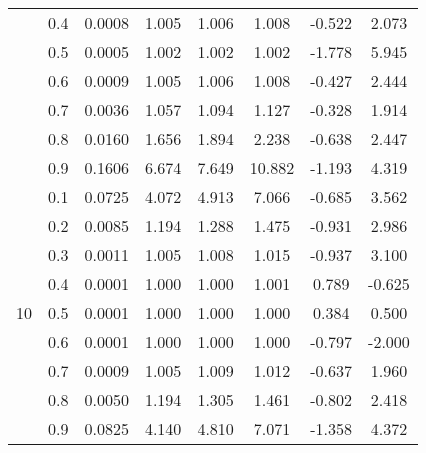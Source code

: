 \documentclass[11pt,a4paper]{report}
\begin{document}
\begin{longtable}{ | c | c || c | c | c | c | c | c | }
 & 0.4 & 0.0008 & 1.005 & 1.006 & 1.008 & -0.522 & 2.073 \\
 & 0.5 & 0.0005 & 1.002 & 1.002 & 1.002 & -1.778 & 5.945 \\
 & 0.6 & 0.0009 & 1.005 & 1.006 & 1.008 & -0.427 & 2.444 \\
 & 0.7 & 0.0036 & 1.057 & 1.094 & 1.127 & -0.328 & 1.914 \\
 & 0.8 & 0.0160 & 1.656 & 1.894 & 2.238 & -0.638 & 2.447 \\
 & 0.9 & 0.1606 & 6.674 & 7.649 & 10.882 & -1.193 & 4.319 \\
 \hline
\multirow{9}{*}{10} & 0.1 & 0.0725 & 4.072 & 4.913 & 7.066 & -0.685 & 3.562 \\
 & 0.2 & 0.0085 & 1.194 & 1.288 & 1.475 & -0.931 & 2.986 \\
 & 0.3 & 0.0011 & 1.005 & 1.008 & 1.015 & -0.937 & 3.100 \\
 & 0.4 & 0.0001 & 1.000 & 1.000 & 1.001 & 0.789 & -0.625 \\
 & 0.5 & 0.0001 & 1.000 & 1.000 & 1.000 & 0.384 & 0.500 \\
 & 0.6 & 0.0001 & 1.000 & 1.000 & 1.000 & -0.797 & -2.000 \\
 & 0.7 & 0.0009 & 1.005 & 1.009 & 1.012 & -0.637 & 1.960 \\
 & 0.8 & 0.0050 & 1.194 & 1.305 & 1.461 & -0.802 & 2.418 \\
 & 0.9 & 0.0825 & 4.140 & 4.810 & 7.071 & -1.358 & 4.372 \\
 \hline
\hline
\end{longtable}
\end{document}
